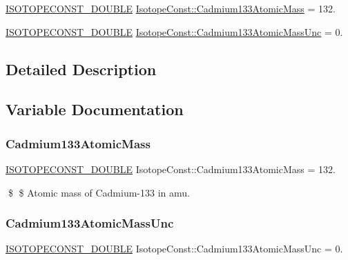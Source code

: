 \begin{DoxyCompactItemize}
\item 
\mbox{\hyperlink{group___isotope_const-_macros_ga8f45a7272ce02c0b4c65c44636ed719a}{I\+S\+O\+T\+O\+P\+E\+C\+O\+N\+S\+T\+\_\+\+D\+O\+U\+B\+LE}} \mbox{\hyperlink{group___isotope_const-_cadmium-_cd133_ga3dd5a985121b80d81b92ca79596d08d0}{Isotope\+Const\+::\+Cadmium133\+Atomic\+Mass}} = 132.
\item 
\mbox{\hyperlink{group___isotope_const-_macros_ga8f45a7272ce02c0b4c65c44636ed719a}{I\+S\+O\+T\+O\+P\+E\+C\+O\+N\+S\+T\+\_\+\+D\+O\+U\+B\+LE}} \mbox{\hyperlink{group___isotope_const-_cadmium-_cd133_gac1de4f6c3f4b7ed707800e0ce27a15af}{Isotope\+Const\+::\+Cadmium133\+Atomic\+Mass\+Unc}} = 0.
\end{DoxyCompactItemize}


\subsection{Detailed Description}


\subsection{Variable Documentation}
\mbox{\label{group___isotope_const-_cadmium-_cd133_ga3dd5a985121b80d81b92ca79596d08d0}} 
\subsubsection{\texorpdfstring{Cadmium133\+Atomic\+Mass}{Cadmium133AtomicMass}}
{\footnotesize\ttfamily \mbox{\hyperlink{group___isotope_const-_macros_ga8f45a7272ce02c0b4c65c44636ed719a}{I\+S\+O\+T\+O\+P\+E\+C\+O\+N\+S\+T\+\_\+\+D\+O\+U\+B\+LE}} Isotope\+Const\+::\+Cadmium133\+Atomic\+Mass = 132.}

\$ \$ Atomic mass of Cadmium-\/133 in amu. \mbox{\label{group___isotope_const-_cadmium-_cd133_gac1de4f6c3f4b7ed707800e0ce27a15af}} 
\subsubsection{\texorpdfstring{Cadmium133\+Atomic\+Mass\+Unc}{Cadmium133AtomicMassUnc}}
{\footnotesize\ttfamily \mbox{\hyperlink{group___isotope_const-_macros_ga8f45a7272ce02c0b4c65c44636ed719a}{I\+S\+O\+T\+O\+P\+E\+C\+O\+N\+S\+T\+\_\+\+D\+O\+U\+B\+LE}} Isotope\+Const\+::\+Cadmium133\+Atomic\+Mass\+Unc = 0.}

